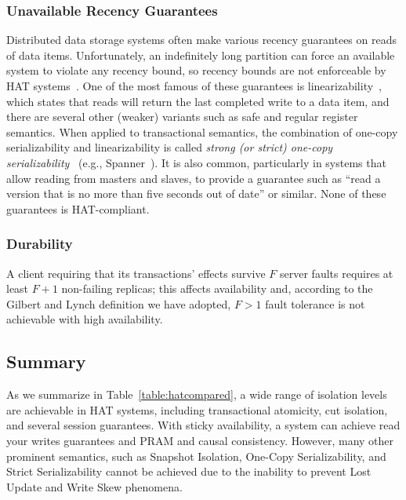 \subsubsection{Unavailable Recency Guarantees}

Distributed data storage systems often make various recency guarantees
on reads of data items.  Unfortunately, an indefinitely long partition
can force an available system to violate any recency bound, so recency
bounds are not enforceable by HAT systems~\cite{gilbert-cap}. One of
the most famous of these guarantees is
linearizability~\cite{herlihy-art}, which states that reads will
return the last completed write to a data item, and there are several
other (weaker) variants such as safe and regular register
semantics. When applied to transactional semantics, the combination of
one-copy serializability and linearizability is called \textit{strong
  (or strict) one-copy serializability}~\cite{adya} (e.g.,
Spanner~\cite{spanner}). It is also common, particularly in systems
that allow reading from masters and slaves, to provide a guarantee
such as ``read a version that is no more than five seconds out of
date'' or similar. None of these guarantees is HAT-compliant.

\subsubsection{Durability}

A client requiring that its transactions' effects survive $F$ server
faults requires at least $F+1$ non-failing replicas; this affects
availability and, according to the Gilbert and Lynch definition we
have adopted, $F>1$ fault tolerance is not achievable with high
availability.


\subsection{Summary}
\label{sec:hat-summary}

As we summarize in Table~\ref{table:hatcompared}, a wide range of
isolation levels are achievable in HAT systems, including
transactional atomicity, cut isolation, and several session
guarantees. With sticky availability, a system can achieve read your
writes guarantees and PRAM and causal consistency. However, many other
prominent semantics, such as Snapshot Isolation, One-Copy
Serializability, and Strict Serializability cannot be achieved due to
the inability to prevent Lost Update and Write Skew phenomena.

